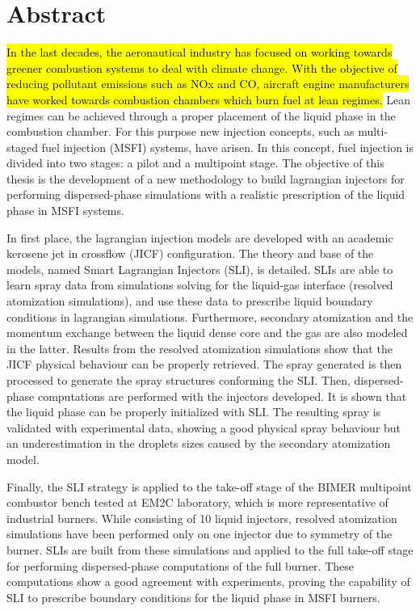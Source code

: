 \chapter*{Abstract}
    
\hl{In the last decades, the aeronautical industry has focused on working towards greener combustion systems to deal with climate change. With the objective of reducing pollutant emissions such as NOx and CO, aircraft engine manufacturers have worked towards combustion chambers which burn fuel at lean regimes.} Lean regimes can be achieved through a proper placement of the liquid phase in the combustion chamber. For this purpose new injection concepts, such as multi-staged fuel injection (MSFI) systems, have arisen. In this concept, fuel injection is divided into two stages: a pilot and a multipoint stage. The objective of this thesis is the development of a new methodology to build lagrangian injectors for performing dispersed-phase simulations with a realistic prescription of the liquid phase in MSFI systems.

In first place, the lagrangian injection models are developed with an academic kerosene jet in crossflow (JICF) configuration. The theory and base of the models, named Smart Lagrangian Injectors (SLI), is detailed. SLIs are able to learn spray data from simulations solving for the liquid-gas interface (resolved atomization simulations), and use these data to prescribe liquid boundary conditions in lagrangian simulations. Furthermore, secondary atomization and the momentum exchange between the liquid dense core and the gas are also modeled in the latter.  Results from the resolved atomization simulations show that the JICF physical behaviour can be properly retrieved. The spray generated is then processed to generate the spray structures conforming the SLI. Then, dispersed-phase computations are performed with the injectors developed. It is shown that the liquid phase can be properly initialized with SLI. The resulting spray is validated with experimental data, showing a good physical spray behaviour but an underestimation in the droplets sizes caused by the secondary atomization model. %

Finally, the SLI strategy is applied to the take-off stage of the BIMER multipoint combustor bench tested at EM2C laboratory, which is more representative of industrial burners. While consisting of 10 liquid injectors, resolved atomization simulations have been performed only on one injector due to symmetry of the burner. SLIs are built from these simulations and applied to the full take-off stage for performing dispersed-phase computations of the full burner. These computations show a good agreement with experiments, proving the capability of SLI to prescribe boundary conditions for the liquid phase in MSFI burners.

